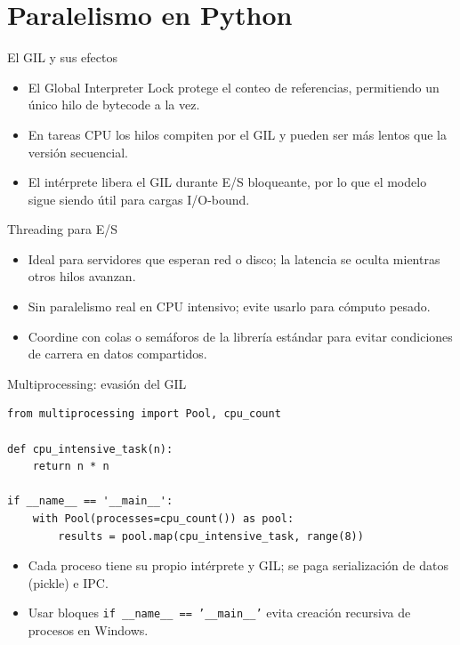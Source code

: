 \section{Paralelismo en Python}

\begin{frame}{El GIL y sus efectos}
  \begin{itemize}
    \item El Global Interpreter Lock protege el conteo de referencias, permitiendo un único hilo de bytecode a la vez.
    \item En tareas CPU los hilos compiten por el GIL y pueden ser más lentos que la versión secuencial.
    \item El intérprete libera el GIL durante E/S bloqueante, por lo que el modelo sigue siendo útil para cargas I/O-bound.
  \end{itemize}
\end{frame}

\begin{frame}{Threading para E/S}
  \begin{itemize}
    \item Ideal para servidores que esperan red o disco; la latencia se oculta mientras otros hilos avanzan.
    \item Sin paralelismo real en CPU intensivo; evite usarlo para cómputo pesado.
    \item Coordine con colas o semáforos de la librería estándar para evitar condiciones de carrera en datos compartidos.
  \end{itemize}
\end{frame}

\begin{frame}[fragile]{Multiprocessing: evasión del GIL}
  \lstset{language=Python}
  \begin{lstlisting}
from multiprocessing import Pool, cpu_count

def cpu_intensive_task(n):
    return n * n

if __name__ == '__main__':
    with Pool(processes=cpu_count()) as pool:
        results = pool.map(cpu_intensive_task, range(8))
  \end{lstlisting}
  \begin{itemize}
    \item Cada proceso tiene su propio intérprete y GIL; se paga serialización de datos (pickle) e IPC.
    \item Usar bloques \texttt{if \_\_name\_\_ == '\_\_main\_\_'} evita creación recursiva de procesos en Windows.
  \end{itemize}
\end{frame}

